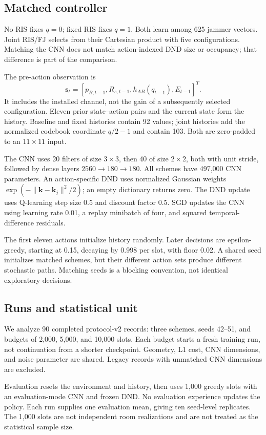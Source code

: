 \documentclass[journal,10pt,twocolumn]{IEEEtran}
\begin{document}
\subsection{Matched controller}
No RIS fixes $q=0$; fixed RIS fixes $q=1$. Both learn among 625 jammer vectors. Joint RIS/FJ selects from their Cartesian product with five configurations. Matching the CNN does not match action-indexed DND size or occupancy; that difference is part of the comparison.

The pre-action observation is
\begin{equation}
\mathbf{s}_t=[p_{B,t-1},R_{s,t-1},h_{AB}(q_{t-1}),E_{t-1}]^T.
\end{equation}
It includes the installed channel, not the gain of a subsequently selected configuration. Eleven prior state--action pairs and the current state form the history. Baseline and fixed histories contain 92 values; joint histories add the normalized codebook coordinate $q/2-1$ and contain 103. Both are zero-padded to an $11\times11$ input.

The CNN uses 20 filters of size $3\times3$, then 40 of size $2\times2$, both with unit stride, followed by dense layers $2560\to180\to180$. All schemes have 497,000 CNN parameters. An action-specific DND uses normalized Gaussian weights $\exp(-\|\mathbf{k}-\mathbf{k}_j\|^2/2)$; an empty dictionary returns zero. The DND update uses Q-learning step size 0.5 and discount factor 0.5. SGD updates the CNN using learning rate 0.01, a replay minibatch of four, and squared temporal-difference residuals.

The first eleven actions initialize history randomly. Later decisions are epsilon-greedy, starting at 0.15, decaying by 0.998 per slot, with floor 0.02. A shared seed initializes matched schemes, but their different action sets produce different stochastic paths. Matching seeds is a blocking convention, not identical exploratory decisions.

\subsection{Runs and statistical unit}
We analyze 90 completed protocol-v2 records: three schemes, seeds 42--51, and budgets of 2,000, 5,000, and 10,000 slots. Each budget starts a fresh training run, not continuation from a shorter checkpoint. Geometry, L1 cost, CNN dimensions, and noise parameter are shared. Legacy records with unmatched CNN dimensions are excluded.

Evaluation resets the environment and history, then uses 1,000 greedy slots with an evaluation-mode CNN and frozen DND. No evaluation experience updates the policy. Each run supplies one evaluation mean, giving ten seed-level replicates. The 1,000 slots are not independent room realizations and are not treated as the statistical sample size.
\end{document}
